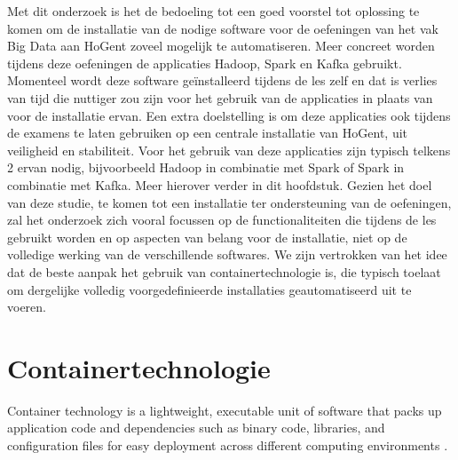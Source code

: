 Met dit onderzoek is het de bedoeling tot een goed voorstel tot oplossing te komen om de installatie van de nodige software voor de oefeningen van het vak Big Data aan HoGent zoveel mogelijk te automatiseren.
Meer concreet worden tijdens deze oefeningen de applicaties Hadoop, Spark en Kafka gebruikt. Momenteel wordt deze software geïnstalleerd tijdens de les zelf en dat is verlies van tijd die nuttiger zou zijn voor het gebruik van de applicaties in plaats van voor de installatie ervan. 
\newline
\newline
Een extra doelstelling is om deze applicaties ook tijdens de examens te laten gebruiken op een centrale installatie van HoGent, uit veiligheid en stabiliteit.
\newline
\newline
Voor het gebruik van deze applicaties zijn typisch telkens 2 ervan nodig, bijvoorbeeld Hadoop in combinatie met Spark of Spark in combinatie met Kafka. Meer hierover verder in dit hoofdstuk.
\newline
\newline
Gezien het doel van deze studie, te komen tot een installatie ter ondersteuning van de oefeningen, zal het onderzoek zich vooral focussen op de functionaliteiten die tijdens de les gebruikt worden en op aspecten van belang voor de installatie, niet op de volledige werking van de verschillende softwares.
\newline
\newline
We zijn vertrokken van het idee dat de beste aanpak het gebruik van containertechnologie is, die typisch toelaat om dergelijke volledig voorgedefinieerde installaties geautomatiseerd uit te voeren.

\section{Containertechnologie}
Container technology is a lightweight, executable unit of software that packs up application code and dependencies such as binary code, libraries, and configuration files for easy deployment across different computing environments \autocite{Solarwinds2023}.

